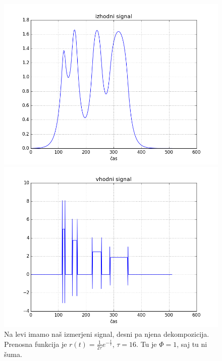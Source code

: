 \documentclass[slovene,11pt,a4paper]{article}
\numberwithin{equation}{section} %
\numberwithin{figure}{section} %
\numberwithin{table}{section} %
\begin{document}
\begin{figure}[h]
\centering
\begin{minipage}{0.5\textwidth}
\centering
\includegraphics[scale=0.4]{slike/druga_izhodni_signal.png}
\end{minipage}\hfill
\begin{minipage}{0.5\textwidth}
\centering
\includegraphics[scale=0.4]{slike/druga_vhodni_signal.png}
\end{minipage}
\caption{Na levi imamo naš izmerjeni signal, desni pa njena dekompozicija. Prenosna funkcija je $r(t)=\frac{1}{2 \tau}e^{-\frac{t}{\tau}}$, $\tau=16$. Tu je $\Phi=1$, saj tu ni šuma.}
\end{figure}
\end{document}
